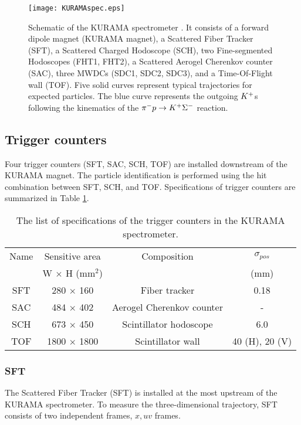 \begin{figure}[!h]
 \begin{center}
   \texttt{[image: KURAMAspec.eps]}
   \caption{Schematic of the KURAMA spectrometer \cite{Nana-D}. It consists of a forward dipole magnet (KURAMA magnet), a Scattered Fiber Tracker (SFT), a Scattered Charged Hodoscope (SCH), two Fine-segmented Hodoscopes (FHT1, FHT2), a Scattered Aerogel Cherenkov counter (SAC), three MWDCs (SDC1, SDC2, SDC3), and a Time-Of-Flight wall (TOF). Five solid curves represent typical trajectories for expected particles. The blue curve represents the outgoing $K^{+}$s following the kinematics of the $\pi^{-} p\to K^{+}\Sigma^{-}$ reaction.}
   \label{fig-KURAMAspec}
 \end{center}
\end{figure}

%
\subsection{Trigger counters}
Four trigger counters (SFT, SAC, SCH, TOF) are installed downstream of the KURAMA magnet. The particle identification is performed using the hit combination between SFT, SCH, and TOF. Specifications of trigger counters are summarized in Table \ref{tab-KURAMAspec-trig}.

\begin{table}[h]
  \begin{center}
    \caption{The list of specifications of the trigger counters in the KURAMA spectrometer.}
    \begin{tabular}{cccc} \hline \hline
      Name & Sensitive area & Composition & $\sigma_{pos}$ \\
       & W $\times$ H (mm$^2$) & & (mm) \\ \hline
      SFT& 280 $\times$ 160 & Fiber tracker & 0.18  \\
      SAC& 484 $\times$ 402 & Aerogel Cherenkov counter & -  \\
      SCH & 673 $\times$ 450 & Scintillator hodoscope & 6.0  \\ 
      TOF & 1800 $\times$ 1800 & Scintillator wall & 40 (H), 20 (V)  \\ 
\hline\hline
   \end{tabular}
   \label{tab-KURAMAspec-trig}
   \end{center}
\end{table}

%
\subsubsection{SFT}
The Scattered Fiber Tracker (SFT) is installed at the most upstream of the KURAMA spectrometer. To measure the three-dimensional trajectory, SFT consists of two independent frames, $x, uv$ frames.

